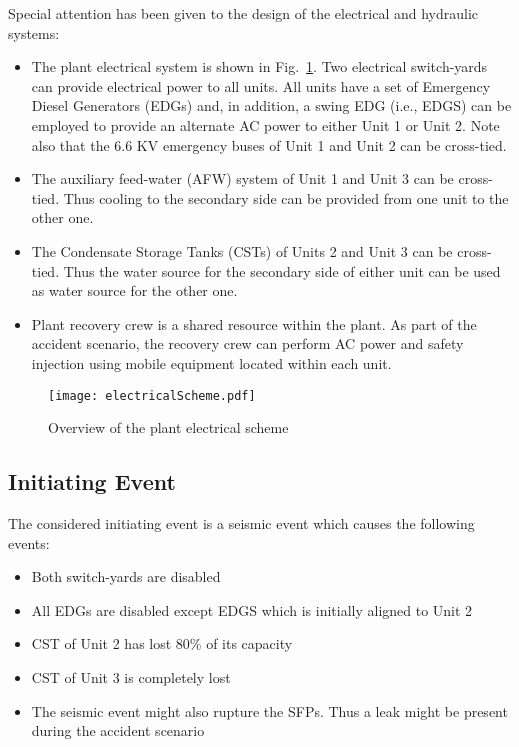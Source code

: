Special attention has been given to the design of the electrical and hydraulic systems:
\begin{itemize}
  \item The plant electrical system is shown in Fig.~\ref{fig:electricalScheme}. Two electrical switch-yards can 
        provide electrical power to all units. All units have a set of Emergency Diesel Generators (EDGs) 
        and, in addition, a swing EDG (i.e., EDGS) can be employed to provide an alternate AC power to either
        Unit 1 or Unit 2. Note also that the 6.6 KV emergency buses of Unit 1 and Unit 2 can be cross-tied.
  \item The auxiliary feed-water (AFW) system of Unit 1 and Unit 3 can be cross-tied. Thus cooling to the 
        secondary side can be provided from one unit to the other one.
  \item The Condensate Storage Tanks (CSTs) of Units 2 and Unit 3 can be cross-tied. Thus the water source 
        for the secondary side of either unit can be used as water source for the other one. 
        \item Plant recovery crew is a shared resource within the plant. As part of the accident scenario, 
        the recovery crew can perform AC power and safety injection using mobile equipment located within each unit.
\end{itemize}

\begin{figure}
    \centering
    \centerline{\texttt{[image: electricalScheme.pdf]}}
    \caption{Overview of the plant electrical scheme}
    \label{fig:electricalScheme}
\end{figure}

\subsection{Initiating Event}

The considered initiating event is a seismic event which causes the following events:
\begin{itemize}
  \item Both switch-yards are disabled
  \item All EDGs are disabled except EDGS which is initially aligned to Unit 2
  \item CST of Unit 2 has lost 80\% of its capacity 
  \item CST of Unit 3 is completely lost
  \item The seismic event might also rupture the SFPs. Thus a leak might be present during the accident scenario
\end{itemize}

